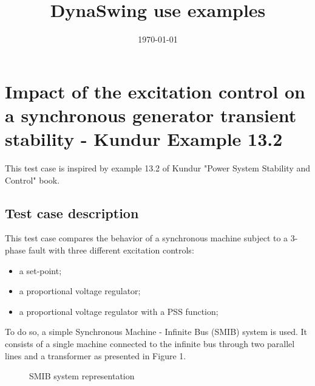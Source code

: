 \documentclass[a4paper, 12pt]{report}
\begin{document}
\title{DynaSwing use examples}
\date\today

\maketitle
\tableofcontents

\chapter{Impact of the excitation control on a synchronous generator transient stability - Kundur Example 13.2}

This test case is inspired by example 13.2 of Kundur "Power System Stability and Control" book.

\section{Test case description}

This test case compares the behavior of a synchronous machine subject to a 3-phase fault with three different excitation controls:
\begin{itemize}
\item a set-point;
\item a proportional voltage regulator;
\item a proportional voltage regulator with a PSS function;
\end{itemize}
To do so, a simple Synchronous Machine - Infinite Bus (SMIB) system is used. It consists of a single machine connected to the infinite bus through two parallel lines and a transformer as presented in Figure 1.

\begin{figure}[H]
\centering
\def\factor{0.4}
\caption{SMIB system representation}
\label{circuit-1}
\end{figure}
\end{document}
